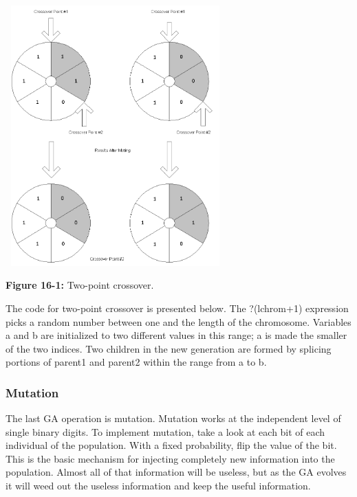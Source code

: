 \begin{center}
\includegraphics[width=3.322in,height=3.9453in]{ub-img/ub-img45.png}
\end{center}

{\sffamily\bfseries Figure 16-1:}
{\sffamily Two-point crossover.}

The code for two-point crossover is presented below. The
\textsf{?(lchrom+1)} expression picks a random number between one and
the length of the chromosome. Variables \textsf{a} and \textsf{b} are
initialized to two different values in this range; \textsf{a} is made
the smaller of the two indices. Two children in the new generation are
formed by splicing portions of \textsf{parent1} and \textsf{parent2}
within the range from \textsf{a} to \textsf{b}.


\subsubsection{Mutation}

The last GA operation is mutation. Mutation works at the independent
level of single binary digits. To implement mutation, take a look at
each bit of each individual of the population. With a fixed
probability, flip the value of the bit. This is the basic mechanism for
injecting completely new information into the population. Almost all of
that information will be useless, but as the GA evolves it will weed
out the useless information and keep the useful information. 

